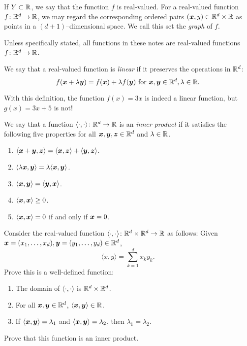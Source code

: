 If $Y \subset \mathbb{R}$, we say that the function $f$ is real-valued.  For a real-valued function $f\colon \mathbb{R}^d \to \mathbb{R}$, we may regard the corresponding ordered pairs $(\boldsymbol{x}, y) \in \mathbb{R}^d\times\mathbb{R}$ as points in a $(d+1)$--dimensional space.  We call this set the \emph{graph} of $f$.

Unless specifically stated, all functions in these notes are real-valued functions $f \colon \mathbb{R}^d \to \mathbb{R}$.

\begin{example}\label{example:linearFunction}
We say that a real-valued function is \emph{linear} if it preserves the operations in $\mathbb{R}^d$: 
\begin{equation*}
f(\boldsymbol{x} + \lambda \boldsymbol{y}) = f(\boldsymbol{x}) + \lambda f(\boldsymbol{y}) \text{ for }\boldsymbol{x}, \boldsymbol{y} \in \mathbb{R}^d, \lambda \in \mathbb{R}.
\end{equation*}

With this definition, the function $f(x) = 3x$ is indeed a linear function, but $g(x)=3x+5$ is not!  
\end{example}

\begin{example}\label{example:innerprod}
We say that a function $\langle \cdot, \cdot \rangle \colon \mathbb{R}^d \to \mathbb{R}$ is an \emph{inner product} if it satisfies the following five properties for all $\boldsymbol{x}, \boldsymbol{y}, \boldsymbol{z} \in \mathbb{R}^d$ and $\lambda \in \mathbb{R}$.
\begin{enumerate}
\item $\langle \boldsymbol{x}+\boldsymbol{y}, \boldsymbol{z} \rangle = \langle \boldsymbol{x}, \boldsymbol{z} \rangle + \langle \boldsymbol{y}, \boldsymbol{z} \rangle$.
\item $\langle \lambda \boldsymbol{x}, \boldsymbol{y} \rangle = \lambda \langle \boldsymbol{x}, \boldsymbol{y} \rangle$.
\item $\langle \boldsymbol{x}, \boldsymbol{y} \rangle = \langle \boldsymbol{y}, \boldsymbol{x} \rangle$.
\item $\langle \boldsymbol{x}, \boldsymbol{x} \rangle \geq 0$.  
\item $\langle \boldsymbol{x}, \boldsymbol{x} \rangle = 0$ if and only if $\boldsymbol{x} = 0$.
\end{enumerate}
\end{example}

\begin{problem}\label{problem:innerprodRd}
Consider the real-valued function $\langle \cdot, \cdot \rangle \colon \mathbb{R}^d \times \mathbb{R}^d \to \mathbb{R}$ as follows: Given $\boldsymbol{x} = (x_1, \dotsc, x_d), \boldsymbol{y} = (y_1, \dotsc, y_d) \in \mathbb{R}^d$, 
\begin{equation*}
\langle x, y \rangle = \sum_{k=1}^d x_k y_k.
\end{equation*}
Prove this is a well-defined function:
\begin{enumerate}
	\item The domain of $\langle \cdot, \cdot \rangle$ is $\mathbb{R}^d \times \mathbb{R}^d$.
	\item For all $\boldsymbol{x}, \boldsymbol{y} \in \mathbb{R}^d$, $\langle \boldsymbol{x}, \boldsymbol{y} \rangle \in \mathbb{R}$.
	\item  If $\langle \boldsymbol{x}, \boldsymbol{y} \rangle = \lambda_1$ and $\langle \boldsymbol{x}, \boldsymbol{y} \rangle = \lambda_2$, then $\lambda_1=\lambda_2$.
\end{enumerate}
Prove that this function is an inner product.
\end{problem}

